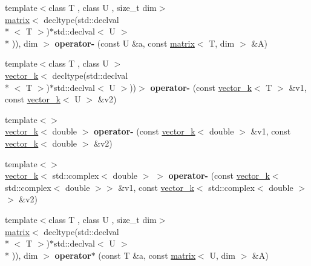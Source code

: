 \begin{DoxyCompactItemize}
\item 
\hypertarget{namespacekeycpp_aaca75edcfed33360ce11172c32968d04}{{\footnotesize template$<$class T , class U , size\-\_\-t dim$>$ }\\\hyperlink{classkeycpp_1_1matrix}{matrix}$<$ decltype(std\-::declval\\*
$<$ T $>$)$\ast$std\-::declval$<$ U $>$\\*
)), dim $>$ {\bfseries operator-\/} (const U \&a, const \hyperlink{classkeycpp_1_1matrix}{matrix}$<$ T, dim $>$ \&A)}\label{namespacekeycpp_aaca75edcfed33360ce11172c32968d04}

\item 
\hypertarget{namespacekeycpp_a891589b60d1c968b44986f3b7d56586b}{{\footnotesize template$<$class T , class U $>$ }\\\hyperlink{classkeycpp_1_1vector__k}{vector\-\_\-k}$<$ decltype(std\-::declval\\*
$<$ T $>$)$\ast$std\-::declval$<$ U $>$))$>$ {\bfseries operator-\/} (const \hyperlink{classkeycpp_1_1vector__k}{vector\-\_\-k}$<$ T $>$ \&v1, const \hyperlink{classkeycpp_1_1vector__k}{vector\-\_\-k}$<$ U $>$ \&v2)}\label{namespacekeycpp_a891589b60d1c968b44986f3b7d56586b}

\item 
\hypertarget{namespacekeycpp_a2a6e4104db7159c74673aacae14286ef}{{\footnotesize template$<$$>$ }\\\hyperlink{classkeycpp_1_1vector__k}{vector\-\_\-k}$<$ double $>$ {\bfseries operator-\/} (const \hyperlink{classkeycpp_1_1vector__k}{vector\-\_\-k}$<$ double $>$ \&v1, const \hyperlink{classkeycpp_1_1vector__k}{vector\-\_\-k}$<$ double $>$ \&v2)}\label{namespacekeycpp_a2a6e4104db7159c74673aacae14286ef}

\item 
\hypertarget{namespacekeycpp_a95c0f9757ba86c696c6c5bfa874c8a49}{{\footnotesize template$<$$>$ }\\\hyperlink{classkeycpp_1_1vector__k}{vector\-\_\-k}$<$ std\-::complex$<$ double $>$ $>$ {\bfseries operator-\/} (const \hyperlink{classkeycpp_1_1vector__k}{vector\-\_\-k}$<$ std\-::complex$<$ double $>$$>$ \&v1, const \hyperlink{classkeycpp_1_1vector__k}{vector\-\_\-k}$<$ std\-::complex$<$ double $>$$>$ \&v2)}\label{namespacekeycpp_a95c0f9757ba86c696c6c5bfa874c8a49}

\item 
\hypertarget{namespacekeycpp_a0fb730e3fdb0eb44a13913518ce0afc1}{{\footnotesize template$<$class T , class U , size\-\_\-t dim$>$ }\\\hyperlink{classkeycpp_1_1matrix}{matrix}$<$ decltype(std\-::declval\\*
$<$ T $>$)$\ast$std\-::declval$<$ U $>$\\*
)), dim $>$ {\bfseries operator$\ast$} (const T \&a, const \hyperlink{classkeycpp_1_1matrix}{matrix}$<$ U, dim $>$ \&A)}\label{namespacekeycpp_a0fb730e3fdb0eb44a13913518ce0afc1}


\end{DoxyCompactItemize}
